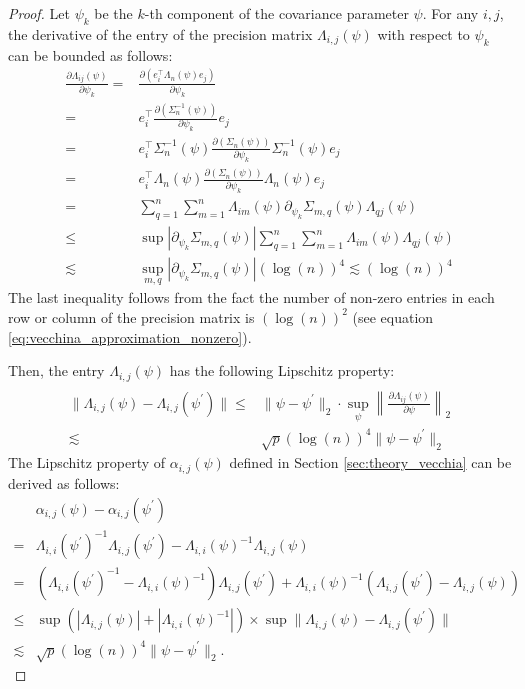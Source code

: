 \documentclass[12pt]{article}
\begin{document}
\begin{proof}

Let $\psi_k$ be the $k$-th component of the covariance parameter $\psi$. For any $i,j$, the derivative of the entry of the precision matrix $\Lambda_{i,j}(\psi)$ with respect to $\psi_k$ can be bounded as follows:
\begin{align*}
    \frac{\partial \Lambda_{ij}(\psi)}{\partial\psi_k} =&\frac{\partial(e_i^\top\Lambda_n(\psi)e_j)}{\partial\psi_k}\\
    = &e_i^\top\frac{\partial(\Sigma^{-1}_n(\psi))}{\partial\psi_k} e_j\\
    = &e_i^\top\Sigma_n^{-1}(\psi)\frac{\partial(\Sigma_n(\psi))}{\partial\psi_k}\Sigma_n^{-1}(\psi) e_j\\
    = &e_i^\top\Lambda_n(\psi)\frac{\partial(\Sigma_n(\psi))}{\partial\psi_k}\Lambda_n(\psi) e_j\\
    = & \sum_{q=1}^n\sum_{m=1}^n \Lambda_{im}(\psi) \partial_{\psi_k} \Sigma_{m,q}(\psi)\Lambda_{qj}(\psi)\\
    \leq & \sup\left|\partial_{\psi_k} \Sigma_{m,q}(\psi)\right| \sum_{q=1}^n\sum_{m=1}^n \Lambda_{im}(\psi) \Lambda_{qj}(\psi)\\
    \lesssim & \sup_{m,q}\left|\partial_{\psi_k} \Sigma_{m,q}(\psi)\right| (\log(n))^4 \lesssim (\log(n))^4
\end{align*}
The last inequality follows from the fact the number of non-zero entries in each row or column of the precision matrix is $(\log(n))^2$ (see equation \eqref{eq:vecchina_approximation_nonzero}).

Then, the entry $\Lambda_{i,j}(\psi)$ has the following Lipschitz property:
\begin{align*}
   \\\|\Lambda_{i,j}(\psi)  - \Lambda_{i,j}(\psi^\prime) \|
   \leq &\|\psi-\psi^\prime\|_2\cdot \sup_{\psi}\left\|\frac{\partial \Lambda_{ij}(\psi)}{\partial\psi}\right\|_2\\
   \lesssim & \sqrt{p}(\log(n))^4\|\psi-\psi^\prime\|_2
\end{align*}
The Lipschitz property of $\alpha_{i,j}(\psi)$ defined in Section \ref{sec:theory_vecchia} can be derived as follows:
\begin{align*}
    &\alpha_{i,j}(\psi)-\alpha_{i,j}(\psi^\prime)\\
    =&\Lambda_{i,i}(\psi^\prime)^{-1}\Lambda_{i,j}(\psi^\prime)-\Lambda_{i,i}(\psi)^{-1}\Lambda_{i,j}(\psi)\\
    = & (\Lambda_{i,i}(\psi^\prime)^{-1} -\Lambda_{i,i}(\psi)^{-1})\Lambda_{i,j}(\psi^\prime) + \Lambda_{i,i}(\psi)^{-1}(\Lambda_{i,j}(\psi^\prime)-\Lambda_{i,j}(\psi))\\
    \leq &\sup\left(\left|\Lambda_{i,j}(\psi)\right| + \left|\Lambda_{i,i}(\psi)^{-1}\right|\right) \times\sup \|\Lambda_{i,j}(\psi)  - \Lambda_{i,j}(\psi^\prime)\|\\
    \lesssim & \sqrt{p}(\log(n))^4\|\psi-\psi^\prime\|_2. 
\end{align*}



\end{proof}
\end{document}
